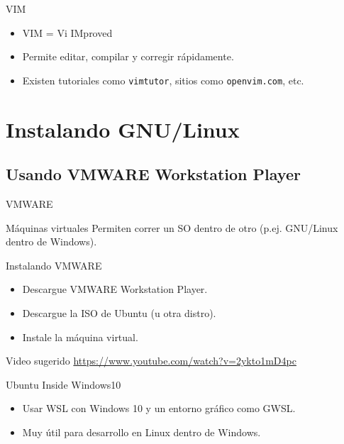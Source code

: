 \documentclass[10pt]{beamer}
\begin{document}
\begin{frame}{VIM}
\begin{itemize}
	\item VIM = Vi IMproved
	\item Permite editar, compilar y corregir rápidamente.
	\item Existen tutoriales como \texttt{vimtutor}, sitios como \texttt{openvim.com}, etc.
\end{itemize}
\end{frame}

\section{Instalando GNU/Linux}
\subsection{Usando VMWARE Workstation Player}

\begin{frame}[fragile]{VMWARE}
	\begin{block}{M\'aquinas virtuales}
		Permiten correr un SO dentro de otro (p.ej. GNU/Linux dentro de Windows).
	\end{block}
\end{frame}

\begin{frame}[fragile]{Instalando VMWARE}
	\begin{itemize}
		\item Descargue VMWARE Workstation Player.
		\item Descargue la ISO de Ubuntu (u otra distro).
		\item Instale la m\'aquina virtual.
	\end{itemize}
\begin{block}{Video sugerido}
\url{https://www.youtube.com/watch?v=2ykto1mD4pc}
\end{block}
\end{frame}

\begin{frame}[fragile]{Ubuntu Inside Windows10}
\begin{itemize}
	\item Usar WSL con Windows 10 y un entorno gráfico como GWSL.
	\item Muy útil para desarrollo en Linux dentro de Windows.
\end{itemize}
\end{frame}
\end{document}
